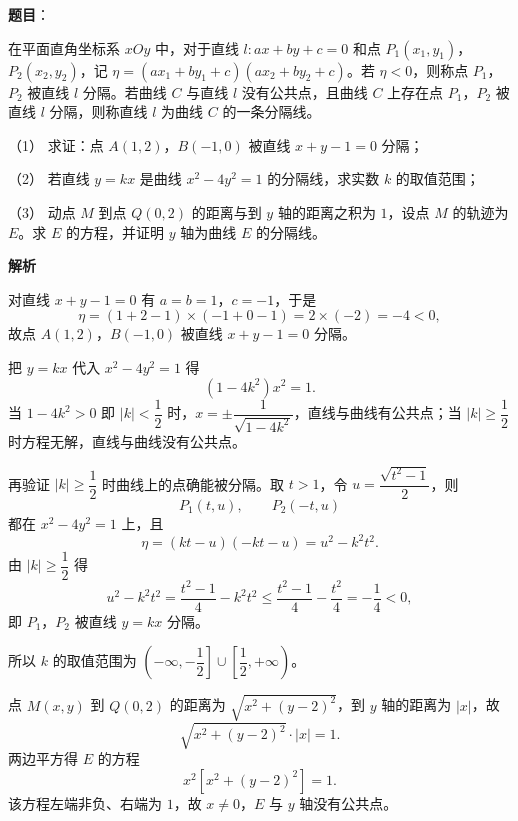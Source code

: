 \begin{answer}

\textbf{题目}：

在平面直角坐标系 $xOy$ 中，对于直线 $l:ax+by+c=0$ 和点 $P_1(x_1,y_1)$，$P_2(x_2,y_2)$，记 $\eta=(ax_1+by_1+c)(ax_2+by_2+c)$。若 $\eta<0$，则称点 $P_1$，$P_2$ 被直线 $l$ 分隔。若曲线 $C$ 与直线 $l$ 没有公共点，且曲线 $C$ 上存在点 $P_1$，$P_2$ 被直线 $l$ 分隔，则称直线 $l$ 为曲线 $C$ 的一条分隔线。

（1） 求证：点 $A(1,2)$，$B(-1,0)$ 被直线 $x+y-1=0$ 分隔；

（2） 若直线 $y=kx$ 是曲线 $x^2-4y^2=1$ 的分隔线，求实数 $k$ 的取值范围；

（3） 动点 $M$ 到点 $Q(0,2)$ 的距离与到 $y$ 轴的距离之积为 $1$，设点 $M$ 的轨迹为 $E$。求 $E$ 的方程，并证明 $y$ 轴为曲线 $E$ 的分隔线。

\textbf{解析}


对直线 $x+y-1=0$ 有 $a=b=1$，$c=-1$，于是
\nopagebreak[4]
\[\eta=(1+2-1)\times(-1+0-1)=2\times(-2)=-4<0,\]
故点 $A(1,2)$，$B(-1,0)$ 被直线 $x+y-1=0$ 分隔。


把 $y=kx$ 代入 $x^2-4y^2=1$ 得
\nopagebreak[4]
\[(1-4k^2)x^2=1 .\]
当 $1-4k^2>0$ 即 $|k|<\dfrac12$ 时，$x=\pm\dfrac1{\sqrt{1-4k^2}}$，直线与曲线有公共点；当 $|k|\geqslant\dfrac12$ 时方程无解，直线与曲线没有公共点。

再验证 $|k|\geqslant\dfrac12$ 时曲线上的点确能被分隔。取 $t>1$，令 $u=\dfrac{\sqrt{t^2-1}}2$，则
\nopagebreak[4]
\[P_1(t,u),\qquad P_2(-t,u)\]
都在 $x^2-4y^2=1$ 上，且
\nopagebreak[4]
\[\eta=(kt-u)(-kt-u)=u^2-k^2t^2 .\]
由 $|k|\geqslant\dfrac12$ 得
\nopagebreak[4]
\[u^2-k^2t^2=\frac{t^2-1}4-k^2t^2\leqslant\frac{t^2-1}4-\frac{t^2}4=-\frac14<0,\]
即 $P_1$，$P_2$ 被直线 $y=kx$ 分隔。

所以 $k$ 的取值范围为 $\left(-\infty,-\dfrac12\right]\cup\left[\dfrac12,+\infty\right)$。


点 $M(x,y)$ 到 $Q(0,2)$ 的距离为 $\sqrt{x^2+(y-2)^2}$，到 $y$ 轴的距离为 $|x|$，故
\nopagebreak[4]
\[\sqrt{x^2+(y-2)^2}\cdot|x|=1 .\]
两边平方得 $E$ 的方程
\nopagebreak[4]
\[x^2\left[x^2+(y-2)^2\right]=1 .\]
该方程左端非负、右端为 $1$，故 $x\neq0$，$E$ 与 $y$ 轴没有公共点。


\end{answer}
